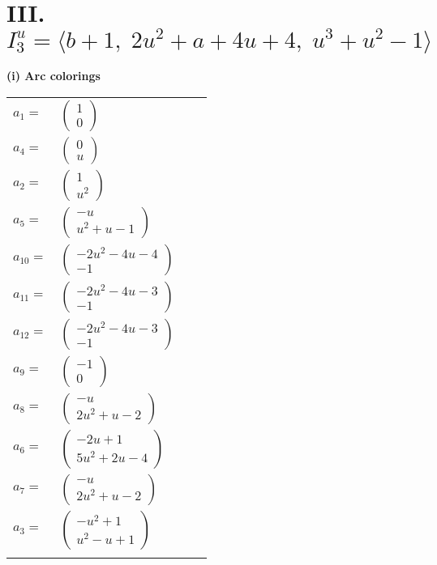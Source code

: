 \documentclass[1p]{elsarticle_modified}
\theoremstyle{definition}
\begin{document}
\centering \section*{III. $I^u_{3}= \langle b+1,\;2 u^2+a+4 u+4,\;u^3+u^2-1 \rangle$}
\flushleft \textbf{(i) Arc colorings}\\
\begin{tabular}{m{7pt} m{180pt} m{7pt} m{180pt} }
\flushright $a_{1}=$&$\begin{pmatrix}1\\0\end{pmatrix}$ \\
\flushright $a_{4}=$&$\begin{pmatrix}0\\u\end{pmatrix}$ \\
\flushright $a_{2}=$&$\begin{pmatrix}1\\u^2\end{pmatrix}$ \\
\flushright $a_{5}=$&$\begin{pmatrix}- u\\u^2+u-1\end{pmatrix}$ \\
\flushright $a_{10}=$&$\begin{pmatrix}-2 u^2-4 u-4\\-1\end{pmatrix}$ \\
\flushright $a_{11}=$&$\begin{pmatrix}-2 u^2-4 u-3\\-1\end{pmatrix}$ \\
\flushright $a_{12}=$&$\begin{pmatrix}-2 u^2-4 u-3\\-1\end{pmatrix}$ \\
\flushright $a_{9}=$&$\begin{pmatrix}-1\\0\end{pmatrix}$ \\
\flushright $a_{8}=$&$\begin{pmatrix}- u\\2 u^2+u-2\end{pmatrix}$ \\
\flushright $a_{6}=$&$\begin{pmatrix}-2 u+1\\5 u^2+2 u-4\end{pmatrix}$ \\
\flushright $a_{7}=$&$\begin{pmatrix}- u\\2 u^2+u-2\end{pmatrix}$ \\
\flushright $a_{3}=$&$\begin{pmatrix}- u^2+1\\u^2- u+1\end{pmatrix}$\\&\end{tabular}
\end{document}
